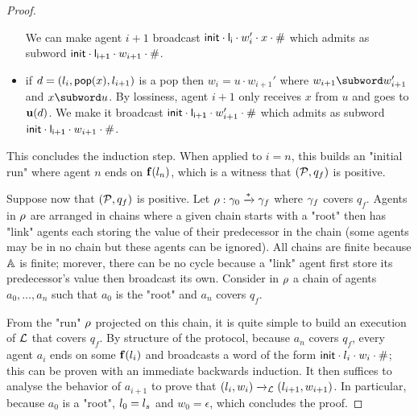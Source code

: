 \begin{proof}
\begin{itemize}
		We can make agent $i+1$ broadcast $\mathsf{init} \cdot \mathsf{l_i} \cdot w'_i \cdot x \cdot \mathsf{\#}$ which admits as subword $\mathsf{init} \cdot \mathsf{l_{i+1}} \cdot w_{i+1} \cdot \mathsf{\#}$.
		\item if $d =(l_i, \mathsf{pop}(x), l_{i+1})$ is a pop then $w_{i} = u \cdot w_{i+1}'$ where $w_{i+1} \subword w_{i+1}'$ and $x \subword u$. 
		By lossiness, agent $i+1$ only receives $x$ from $u$ and goes to $\mathbf{u}(d)$. We make it broadcast $\mathsf{init} \cdot \mathsf{l_{i+1}} \cdot w_{i+1}'  \cdot \mathsf{\#}$ which admits as subword $\mathsf{init} \cdot \mathsf{l_{i+1}} \cdot w_{i+1} \cdot \mathsf{\#}$.
	\end{itemize}
	This concludes the induction step.
	When applied to $i=n$, this builds an "initial run" where agent $n$ ends on $\mathbf{f}(l_n)$, which is a witness that $(\mathcal{P}, q_f)$ is positive.
	
	Suppose now that $(\mathcal{P}, q_f)$ is positive. Let $\rho: \gamma_0 \xrightarrow{*} \gamma_f$ where $\gamma_f$ covers $q_f$. Agents in $\rho$ are arranged in chains where a given chain starts with a "root" then has "link" agents each storing the value of their predecessor in the chain (some agents may be in no chain but these agents can be ignored). All chains are finite because $\mathbb{A}$ is finite; morever, there can be no cycle because a "link" agent first store its predecessor's value then broadcast its own. Consider in $\rho$ a chain of agents $a_0, \dots, a_n$ such that $a_0$ is the "root" and $a_n$ covers $q_f$. 
	
	From the "run" $\rho$ projected on this chain, it is quite simple to build an execution of $\mathcal{L}$ that covers $q_f$. By structure of the protocol, because $a_n$ covers $q_f$, every agent $a_i$ ends on some $\mathbf{f}(l_i)$ and broadcasts a word of the form $\mathsf{init} \cdot l_i \cdot w_i \cdot \mathsf{\#}$; this can be proven with an immediate backwards induction. It then suffices to analyse the behavior of $a_{i+1}$ to prove that $(l_i, w_i) \xrightarrow{}_{\mathcal{L}} (l_{i+1}, w_{i+1})$. In particular, because $a_0$ is a "root", $l_0 = l_s$ and $w_0 = \epsilon$, which concludes the proof. 
\end{proof}